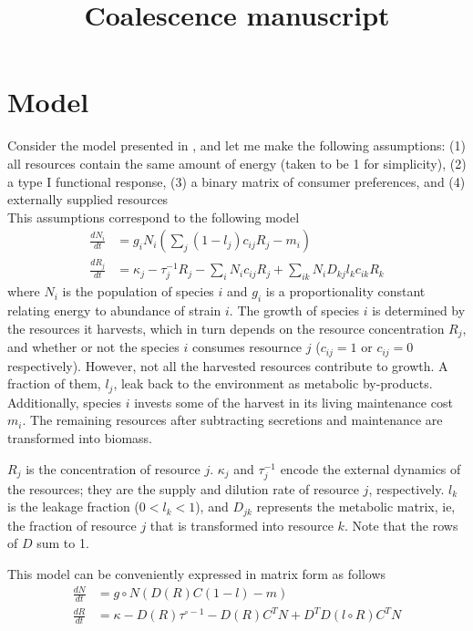\documentclass[12pt]{article}
\title{Coalescence manuscript}
\begin{document}
	\maketitle
	\section{Model}
	Consider the model presented in \cite{Marsland2019}, and let me make the following assumptions: (1) all resources contain the same amount of energy (taken to be 1 for simplicity), (2) a type I functional response, (3) a binary matrix of consumer preferences, and (4) externally supplied resources\\
	This assumptions correspond to the following model
	\begin{equation}\label{hybrid}
		\begin{aligned}
		\frac{dN_i}{dt} &= g_iN_i\left(\sum_j(1-l_j)c_{ij}R_j - m_i\right)\\
		\frac{dR_{j}}{dt} &= \kappa_j - \tau^{-1}_jR_j - \sum_iN_ic_{ij}R_j + \sum_{ik}N_iD_{kj}l_kc_{ik}R_k
		\end{aligned}
	\end{equation}
	where $ N_i $ is the population of species $ i $ and $ g_i $ is a proportionality constant relating energy to abundance of strain $ i $. The growth of species $ i $ is determined by the resources it harvests, which in turn depends on the resource concentration $ R_j $, and whether or not the species $ i $ consumes resournce $ j $ ($ c_{ij} = 1 \text{ or } c_{ij} = 0 $ respectively). However, not all the harvested resources contribute to growth. A fraction of them, $  l_j $, leak back to the environment as metabolic by-products. Additionally, species $ i $ invests some of the harvest in its living maintenance cost $ m_i $. The remaining resources after subtracting secretions and maintenance are transformed into biomass. \par 
	$ R_j $ is the concentration of resource $ j $. $ \kappa_j $ and $ \tau_j^{-1} $ encode the external dynamics of the resources; they are the supply and dilution rate of resource  $ j $, respectively. $ l_k $ is the leakage fraction ($ 0 < l_k < 1 $), and $ D_{jk} $ represents the metabolic matrix, ie, the fraction of resource $ j $ that is transformed into resource $ k $. Note that the rows of $ D $ sum to 1.  \par
	This model can be conveniently expressed in matrix form  as follows
	\begin{equation}
		\begin{aligned}
		\frac{dN}{dt} &= g\circ N\left(D(R)C(1-l) - m\right)\\
		\frac{dR}{dt} &= \kappa - D(R)\tau^{\circ -1}- D(R)C^TN + D^TD(l\circ R)C^TN
		\end{aligned}
	\end{equation}
\end{document}
